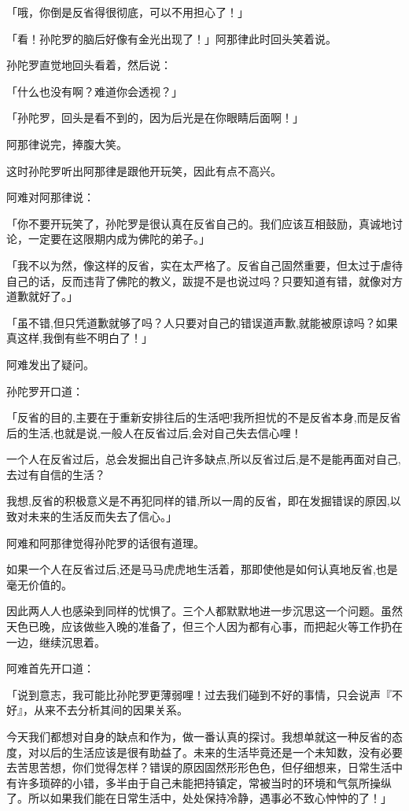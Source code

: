 \documentclass[twoside,openany]{book}
\begin{document}
「哦，你倒是反省得很彻底，可以不用担心了！」

「看！孙陀罗的脑后好像有金光出现了！」阿那律此时回头笑着说。

孙陀罗直觉地回头看着，然后说：

「什么也没有啊？难道你会透视？」

「孙陀罗，回头是看不到的，因为后光是在你眼睛后面啊！」

阿那律说完，捧腹大笑。

这时孙陀罗听出阿那律是跟他开玩笑，因此有点不高兴。

阿难对阿那律说：

「你不要开玩笑了，孙陀罗是很认真在反省自己的。我们应该互相鼓励，真诚地讨论，一定要在这限期内成为佛陀的弟子。」

「我不以为然，像这样的反省，实在太严格了。反省自己固然重要，但太过于虐待自己的话，反而违背了佛陀的教义，跋提不是也说过吗？只要知道有错，就像对方道歉就好了。」

「虽不错,但只凭道歉就够了吗？人只要对自己的错误道声歉,就能被原谅吗？如果真这样,我倒有些不明白了！」

阿难发出了疑问。

孙陀罗开口道：

「反省的目的,主要在于重新安排往后的生活吧!我所担忧的不是反省本身,而是反省后的生活,也就是说,一般人在反省过后,会对自己失去信心哩！

一个人在反省过后，总会发掘出自己许多缺点,所以反省过后,是不是能再面对自己,去过有自信的生活？

我想,反省的积极意义是不再犯同样的错,所以一周的反省，即在发掘错误的原因,以致对未来的生活反而失去了信心。」

阿难和阿那律觉得孙陀罗的话很有道理。

如果一个人在反省过后,还是马马虎虎地生活着，那即使他是如何认真地反省,也是毫无价值的。

因此两人人也感染到同样的忧惧了。三个人都默默地进一步沉思这一个问题。虽然天色已晚，应该做些入晚的准备了，但三个人因为都有心事，而把起火等工作扔在一边，继续沉思着。

阿难首先开口道：

「说到意志，我可能比孙陀罗更薄弱哩！过去我们碰到不好的事情，只会说声『不好』，从来不去分析其间的因果关系。

今天我们都想对自身的缺点和作为，做一番认真的探讨。我想单就这一种反省的态度，对以后的生活应该是很有助益了。未来的生活毕竟还是一个未知数，没有必要去苦思苦想，你们觉得怎样？错误的原因固然形形色色，但仔细想来，日常生活中有许多琐碎的小错，多半由于自己未能把持镇定，常被当时的环境和气氛所操纵了。所以如果我们能在日常生活中，处处保持冷静，遇事必不致心忡忡的了！」
\end{document}
